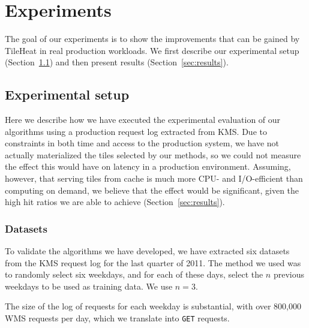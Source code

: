 \documentclass[11pt, oneside]{report}
\begin{document}
{\section{Experiments}
\label{sec:experiments}

The goal of our experiments is to show the improvements that can be gained by TileHeat in real production workloads. We first describe our experimental setup (Section~\ref{sec:setup}) and then present results (Section~\ref{sec:results}).  

\subsection{Experimental setup}
\label{sec:setup}

Here we describe how we have executed the experimental evaluation of our algorithms using a production request log extracted from KMS. Due to constraints in both time and access to the production system, we have not actually materialized the tiles selected by our methods, so we could not measure the effect this would have on latency in a production environment. Assuming, however, that serving tiles from cache is much more CPU- and I/O-efficient than computing on demand, we believe that the effect would be significant, given the high hit ratios we are able to achieve (Section~\ref{sec:results}). 

\subsubsection{Datasets}
\label{sec:datasets}
To validate the algorithms we have developed, we have extracted six datasets from the KMS request log for the last quarter of 2011. The method we used was to randomly select six weekdays, and for each of these days, select the $n$ previous weekdays to be used as training data. We use $n=3$. 

%

The size of the log of requests for each weekday is substantial, with over 800,000 WMS requests per day, which we translate into \texttt{GET} requests. 

}
\end{document}
